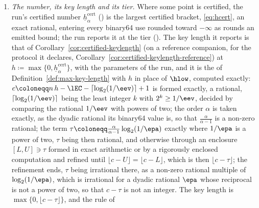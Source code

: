 \begin{requirement}
\begin{enumerate}[label=(\roman*),leftmargin=2.4em]
\begin{enumerate}[label=(\alph*),leftmargin=2.2em]
    $\langle\hat g,\cdot\rangle$ over $\acSet$ for a geometry of
    Requirement~\ref{req:acceptance-geometries} that it solves exactly, less
    $\delta$, a point of any other geometry being not certified
    (); and $b^{\mathrm F}_t$ by
    Lemma~\ref{lem:certified-bracket}\,(iii), each $\ell_p$ from
    , in exact rational
    arithmetic;
  \end{enumerate}
  and the point's certified bracket $b^{\mathrm A}_t+b^{\mathrm F}_t$. A
  point at which any of these is not established is not certified, with the
  reason named, and contributes nothing.
\item \emph{The number, its key length and its tier.} Where some point is
  certified, the run's certified number
  $\underline{h}^{\mathrm{cert}}_{\alpha}$ () is the
  largest certified bracket, \eqref{eq:hcert}, an exact rational, entering
  every binary64 use rounded toward $-\infty$ as
   rounds an emitted bound; the run
  reports it at the  tier ().
  The key length it reports is that of
  Corollary~\ref{cor:certified-keylength} (on a reference companion, for the
  protocol it declares, Corollary~\ref{cor:certified-keylength-reference}) at
  $h\coloneqq\max\{0,\underline{h}^{\mathrm{cert}}_{\alpha}\}$, with the
  parameters of the run, and it is the  of
  Definition~\ref{def:max-key-length} with $h$ in place of $\hlow$, computed
  exactly: $c\coloneqq n\,h-\lEC-\lceil\log_2(1/\eev)\rceil+1$ is formed
  exactly, a rational, $\lceil\log_2(1/\eev)\rceil$ being the least integer
  $k$ with $2^{k}\ge1/\eev$, decided by comparing the rational $1/\eev$ with
  powers of two; the order $\alpha$ is taken exactly, as the dyadic rational
  its binary64 value is, so that $\frac{\alpha}{\alpha-1}$ is a non-zero
  rational; the term
  $\tau\coloneqq\frac{\alpha}{\alpha-1}\log_2(1/\epa)$ exactly where
  $1/\epa$ is a power of two, $\tau$ being then rational, and otherwise
  through an enclosure $[L,U]\ni\tau$ formed in exact arithmetic or by a
  rigorously enclosed computation and refined until
  $\lfloor c-U\rfloor=\lfloor c-L\rfloor$, which is then
  $\lfloor c-\tau\rfloor$; the refinement ends, $\tau$ being irrational
  there, as a non-zero rational multiple of $\log_2(1/\epa)$, which is
  irrational for a dyadic rational $\epa$ whose reciprocal is not a power
  of two, so that $c-\tau$ is not an integer. The key length is
  $\max\{0,\lfloor c-\tau\rfloor\}$, and the rule of

\end{enumerate}
\end{requirement}
